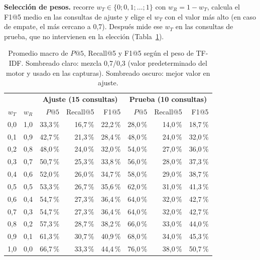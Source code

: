 \documentclass[11pt,letterpaper]{article}
\begin{document}
	\textbf{Selección de pesos.}  recorre \(w_T\in\{0;0{,}1;\dots;1\}\) con \(w_R=1-w_T\), calcula el F1@5 medio en las consultas de ajuste y elige el \(w_T\) con el valor más alto (en caso de empate, el más cercano a 0,7). Después mide ese \(w_T\) en las consultas de prueba, que no intervienen en la elección (Tabla~\ref{tab:pesos}).
	
	\begin{table}[!htbp]
		\centering
		\caption{Promedio macro de $P@5$, Recall@5 y F1@5 según el peso de TF-IDF. Sombreado claro: mezcla 0,7/0,3 (valor predeterminado del motor y usado en las capturas). Sombreado oscuro: mejor valor en ajuste.}\label{tab:pesos}
		\small
		\begin{tabular}{@{}c c rrr rrr@{}}
			\toprule
			\rowcolor{wash} & & \multicolumn{3}{c}{\textbf{Ajuste (15 consultas)}} & \multicolumn{3}{c}{\textbf{Prueba (10 consultas)}}\\
			\rowcolor{wash}\(w_T\) & \(w_R\) & \(P@5\) & Recall@5 & F1@5 & \(P@5\) & Recall@5 & F1@5\\
			\midrule
			0,0 & 1,0 & 33,3\,\% & 16,7\,\% & 22,2\,\% & 28,0\,\% & 14,0\,\% & 18,7\,\%\\
			0,1 & 0,9 & 42,7\,\% & 21,3\,\% & 28,4\,\% & 48,0\,\% & 24,0\,\% & 32,0\,\%\\
			0,2 & 0,8 & 48,0\,\% & 24,0\,\% & 32,0\,\% & 54,0\,\% & 27,0\,\% & 36,0\,\%\\
			0,3 & 0,7 & 50,7\,\% & 25,3\,\% & 33,8\,\% & 56,0\,\% & 28,0\,\% & 37,3\,\%\\
			0,4 & 0,6 & 52,0\,\% & 26,0\,\% & 34,7\,\% & 58,0\,\% & 29,0\,\% & 38,7\,\%\\
			0,5 & 0,5 & 53,3\,\% & 26,7\,\% & 35,6\,\% & 62,0\,\% & 31,0\,\% & 41,3\,\%\\
			0,6 & 0,4 & 54,7\,\% & 27,3\,\% & 36,4\,\% & 64,0\,\% & 32,0\,\% & 42,7\,\%\\
			\rowcolor{wash!55}0,7 & 0,3 & 54,7\,\% & 27,3\,\% & 36,4\,\% & 64,0\,\% & 32,0\,\% & 42,7\,\%\\
			0,8 & 0,2 & 57,3\,\% & 28,7\,\% & 38,2\,\% & 66,0\,\% & 33,0\,\% & 44,0\,\%\\
			0,9 & 0,1 & 61,3\,\% & 30,7\,\% & 40,9\,\% & 68,0\,\% & 34,0\,\% & 45,3\,\%\\
			\rowcolor{wash}1,0 & 0,0 & 66,7\,\% & 33,3\,\% & 44,4\,\% & 76,0\,\% & 38,0\,\% & 50,7\,\%\\
			\bottomrule
		\end{tabular}
	\end{table}
	
\end{document}
